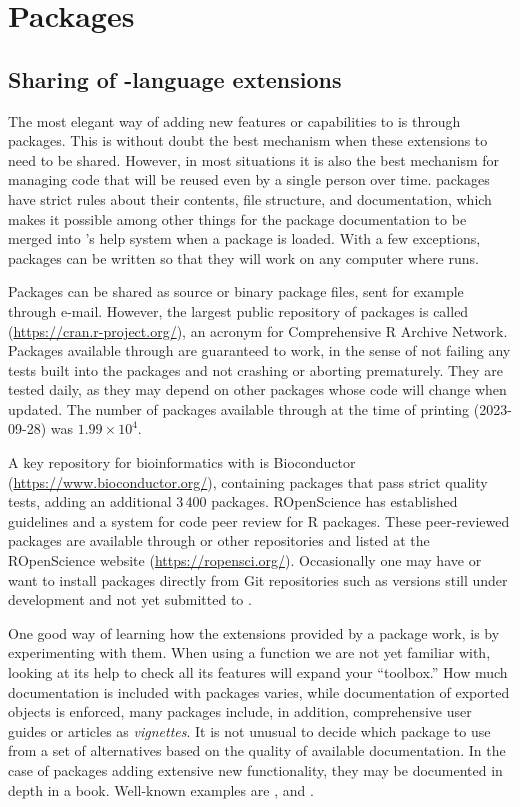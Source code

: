 \documentclass[krantz2]{krantz}\usepackage{knitr}
\begin{document}
\section{Packages}\label{sec:script:packages}

\subsection{Sharing of \Rlang-language extensions}
The most elegant way of adding new features or capabilities to \Rlang is through packages. This is without doubt the best mechanism when these extensions to \Rlang need to be shared. However, in most situations it is also the best mechanism for managing code that will be reused even by a single person over time. \Rlang packages have strict rules about their contents, file structure, and documentation, which makes it possible among other things for the package documentation to be merged into \Rpgrm's help system when a package is loaded. With a few exceptions, packages can be written so that they will work on any computer where \Rpgrm runs.

Packages can be shared as source or binary package files, sent for example through e-mail. However, the largest public repository of \Rpgrm packages is called \CRAN (\url{https://cran.r-project.org/}), an acronym for Comprehensive R Archive Network. Packages available through \CRAN are guaranteed to work, in the sense of not failing any tests built into the packages and not crashing or aborting prematurely. They are tested daily, as they may depend on other packages whose code will change when updated. The number of packages available through \CRAN at the time of printing (2023-09-28) was \ensuremath{1.99\times 10^{4}}.

A key repository for bioinformatics with \Rlang is Bioconductor (\url{https://www.bioconductor.org/}), containing packages that pass strict quality tests, adding an additional 3\,400 packages. ROpenScience has established guidelines and a system for code peer review for R packages. These peer-reviewed packages are available through \CRAN or other repositories and listed at the ROpenScience website (\url{https://ropensci.org/}).
Occasionally one may have or want to install packages directly from Git repositories such as versions still under development and not yet submitted to \CRAN.

One good way of learning how the extensions provided by a package work, is by experimenting with them. When using a function we are not yet familiar with, looking at its help to check all its features will expand your ``toolbox.'' How much documentation is included with packages varies, while documentation of exported objects is enforced, many packages include, in addition, comprehensive user guides or articles as \emph{vignettes}. It is not unusual to decide which package to use from a set of alternatives based on the quality of available documentation. In the case of packages adding extensive new functionality, they may be documented in depth in a book. Well-known examples are  \autocite{Pinheiro2000},  \autocite{Sarkar2008} and  \autocite{Wickham2016}.
\end{document}
